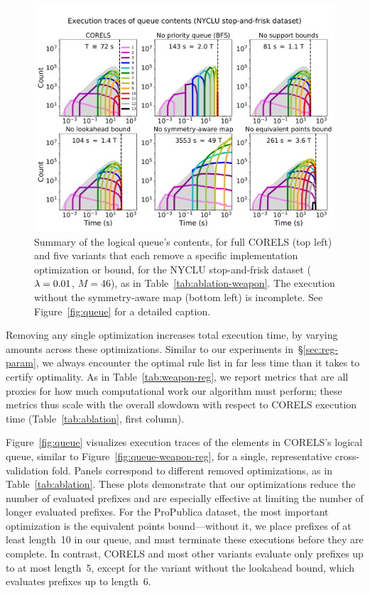 %
\begin{figure}[t!]
\begin{center}
\includegraphics[trim={0mm 0mm 0mm 15mm}, width=\textwidth]{figs/weapon_ablation-queue.pdf}
\end{center}
\vspace{-5mm}
\caption{Summary of the logical queue's contents, for full CORELS (top left)
and five variants that each remove a specific implementation optimization or bound,
for the NYCLU stop-and-frisk dataset (${{\lambda} = 0.01}$, ${M = 46}$), as in Table~\ref{tab:ablation-weapon}.
The execution without the symmetry-aware map (bottom left) is incomplete.
%
See Figure~\ref{fig:queue} for a detailed caption.
}
\label{fig:queue-weapon}
\end{figure}

Removing any single optimization increases total execution time,
by varying amounts across these optimizations.
%
Similar to our experiments in~\S\ref{sec:reg-param}, we always encounter the
optimal rule list in far less time than it takes to certify optimality.
%
As in Table~\ref{tab:weapon-reg}, we report metrics that are all proxies
for how much computational work our algorithm must perform;
these metrics thus scale with the overall slowdown with respect to CORELS execution time
(Table~\ref{tab:ablation}, first column).

Figure~\ref{fig:queue} visualizes execution traces of the elements in CORELS's logical queue,
similar to Figure~\ref{fig:queue-weapon-reg},
for a single, representative cross-validation fold.
%
Panels correspond to different removed optimizations, as in Table~\ref{tab:ablation}.
%
These plots demonstrate that our optimizations reduce the number of evaluated prefixes
and are especially effective at limiting the number of longer evaluated prefixes.
%
For the ProPublica dataset, the most important optimization is the equivalent points
bound---without it, we place prefixes of at least length~10 in our queue,
and must terminate these executions before they are complete.
%
In contrast, CORELS and most other variants evaluate only prefixes up to at most length~5,
except for the variant without the lookahead bound, which evaluates prefixes up to length~6.

